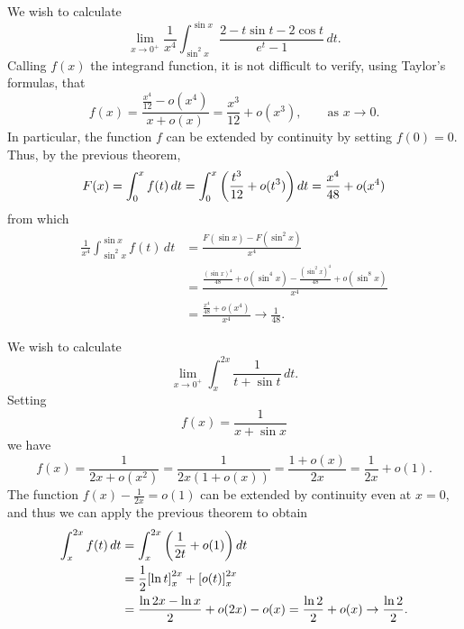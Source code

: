 \begin{example}
We wish to calculate
\[
  \lim_{x\to 0^+} \frac{1}{x^4}\int_{\sin^2 x}^{\sin x} \frac{2- t\sin t - 2 \cos t}{e^t - 1}\, dt.
\]
Calling $f(x)$ the integrand function, it is not difficult to verify, using
Taylor's formulas, that
\[
  f(x)
  = \frac{\frac{x^4}{12}-o(x^4)}{x+o(x)}
  = \frac{x^3}{12} + o(x^3), \qquad \text{as $x\to 0$}.
\]
In particular, the function $f$ can be extended by continuity by setting
$f(0)=0$. Thus, by the previous theorem,
\[
  F(x) = \int_0^x f(t)\, dt
  = \int_0^x {\left( \frac{t^3}{12}+o(t^3) \right)}\, dt
  = \frac{x^4}{48} + o(x^4)
\]
from which
\begin{align*}
 \frac{1}{x^4} \int_{\sin^2 x}^{\sin x}
 f(t) \, dt
 &= \frac{F(\sin x) - F(\sin^2 x)}{x^4}\\
  &= \frac{\frac{(\sin x)^4}{48} + o(\sin^4 x) - \frac{(\sin^2 x)^4}{48} +
 o(\sin^8 x)}{x^4} \\
 &= \frac{\frac{x^4}{48} + o(x^4)}{x^4} \to \frac{1}{48}.
\end{align*}
\end{example}

\begin{example}
We wish to calculate
\[
  \lim_{x\to 0^+} \int_{x}^{2x} \frac{1}{t+\sin t}\, dt.
\]
Setting
\[
  f(x) = \frac{1}{x+\sin x}
\]
we have
\[
 f(x)
  = \frac{1}{2x+o(x^2)} = \frac{1}{2x(1+o(x))}
  = \frac{1+o(x)}{2x} = \frac{1}{2x} + o(1).
\]
The function $f(x)-\frac 1{2x} = o(1)$ can be extended by continuity even at
$x=0$, and thus we can apply the previous theorem to obtain
\begin{align*}
  \int_x^{2x} f(t)\, dt
  &= \int_x^{2x} {\left( \frac 1 {2t} + o(1) \right)}\, dt \\
  &= \frac 1 2 {\left[ \ln t \right]}_x^{2x} +  {\left[ o(t) \right]}_x^{2x} \\
  &= \frac {\ln 2x - \ln x} 2 + o(2x) - o(x)
  = \frac {\ln 2} 2 + o(x) \to \frac{\ln 2}{2}.
\end{align*}
\end{example}

